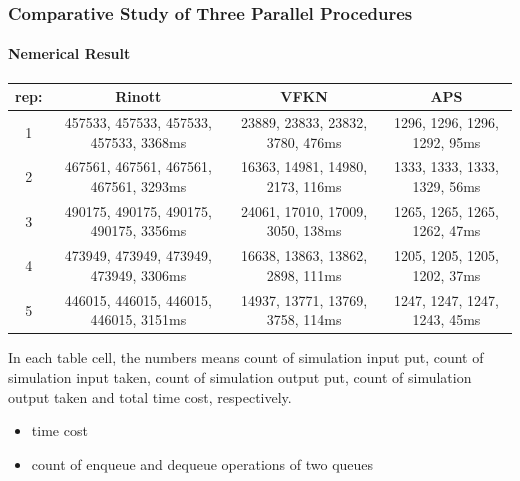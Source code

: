 \documentclass{beamer}
\begin{document}
\begin{frame}
\frametitle{Comparative Study of Three Parallel Procedures}
\framesubtitle{Nemerical Result}
\begin{table}[ht]
\begin{center}
\scalebox{0.6}
{
\begin{tabular}{|c|c|c|c|}
\hline
rep: & Rinott & VFKN & APS \\
\hline
1 & 457533, 457533, 457533, 457533, 3368ms & 23889, 23833, 23832, 3780, 476ms & 1296, 1296, 1296, 1292, 95ms \\
\hline
2 & 467561, 467561, 467561, 467561, 3293ms & 16363, 14981, 14980, 2173, 116ms & 1333, 1333, 1333, 1329, 56ms \\
\hline
3 & 490175, 490175, 490175, 490175, 3356ms & 24061, 17010, 17009, 3050, 138ms & 1265, 1265, 1265, 1262, 47ms \\
\hline
4 & 473949, 473949, 473949, 473949, 3306ms & 16638, 13863, 13862, 2898, 111ms & 1205, 1205, 1205, 1202, 37ms \\
\hline
5 & 446015, 446015, 446015, 446015, 3151ms & 14937, 13771, 13769, 3758, 114ms & 1247, 1247, 1247, 1243, 45ms \\
\hline
\end{tabular}
}
\end{center}
\end{table}
{\tiny In each table cell, the numbers means count of simulation input put, count of simulation input taken, count of simulation output put, count of simulation output taken and total time cost, respectively.}
\begin{itemize}
\item time cost
\item count of enqueue and dequeue operations of two queues
\end{itemize}
\end{frame}
\end{document}
